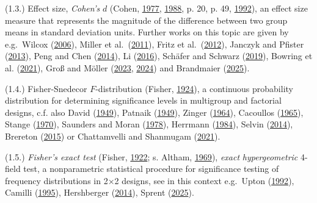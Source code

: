 \documentclass[
]{article}
\begin{document}
(1.3.) Effect size, \emph{Cohen's} \(d\) (Cohen,
\href{https://doi.org/10.1016/C2013-0-10517-X}{1977},
\href{https://doi.org/10.4324/9780203771587}{1988}, p. 20, p. 49,
\href{https://doi.org/10.1037/0033-2909.112.1.155}{1992}), an effect
size measure that represents the magnitude of the difference between two
group means in standard deviation units. Further works on this topic are
given by e.g.~Wilcox
(\href{http://www.jstor.org/stable/20157436}{2006}), Miller et
al.~(\href{https://doi.org/10.1016/j.jval.2010.10.013}{2011}), Fritz et
al.~(\href{https://doi.org/10.1037/a0024338}{2012}), Janczyk and Pfister
(\href{https://doi.org/10.1007/978-3-642-34825-9_7}{2013}), Peng and
Chen (\href{https://www.jstor.org/stable/26594399}{2014}), Li
(\href{https://doi.org/10.3758/s13428-015-0667-z}{2016}), Schäfer and
Schwarz (\href{https://doi.org/10.3389/fpsyg.2019.00813}{2019}), Bowring
et al. (\href{https://doi.org/10.1016/j.neuroimage.2020.117477}{2021}),
Groß and Möller
(\href{https://doi.org/10.1007/s42519-023-00323-w}{2023},
\href{https://doi.org/10.1007/s00362-023-01527-9}{2024}) and Brandmaier
(\href{https://doi.org/10.31234/osf.io/n9ta7_v1}{2025}).

(1.4.) Fisher-Snedecor \(F\)-distribution (Fisher,
\href{https://repository.rothamsted.ac.uk/item/8w2q9/on-a-distribution-yielding-the-error-functions-of-several-well-known-statistics}{1924}),
a continuous probability distribution for determining significance
levels in multigroup and factorial designs, c.f. also David
(\href{http://www.jstor.org/stable/2332676}{1949}), Patnaik
(\href{http://www.jstor.org/stable/2332542}{1949}), Zinger
(\href{http://www.jstor.org/stable/2985223}{1964}), Cacoullos
(\href{http://www.jstor.org/stable/2282687}{1965}), Stange
(\href{https://doi.org/10.1007/978-3-642-85602-0_11}{1970}), Saunders
and Moran (\href{https://doi.org/10.2307/3213414}{1978}), Herrmann
(\href{https://doi.org/10.1007/978-3-322-96320-8_21}{1984}), Selvin
(\href{https://doi.org/10.1002/9781118445112.stat05856}{2014}), Brereton
(\href{https://doi.org/10.1002/cem.2734}{2015}) or Chattamvelli and
Shanmugam (\href{https://doi.org/10.1007/978-3-031-02435-1_7}{2021}).

(1.5.) \emph{Fisher's exact test} (Fisher,
\href{https://doi.org/10.2307/2340521}{1922}; s. Altham,
\href{http://www.jstor.org/stable/2984209}{1969}), \emph{exact}
\emph{hypergeometric} 4-field test, a nonparametric statistical
procedure for significance testing of frequency distributions in 2×2
designs, see in this context e.g.~Upton
(\href{http://www.jstor.org/stable/2982890}{1992}), Camilli
(\href{https://doi.org/10.1007/BF02301418}{1995}), Hershberger
(\href{https://doi.org/10.1002/9781118445112.stat06165}{2014}), Sprent
(\href{https://doi.org/10.1007/978-3-662-69359-9_693}{2025}).
\end{document}
